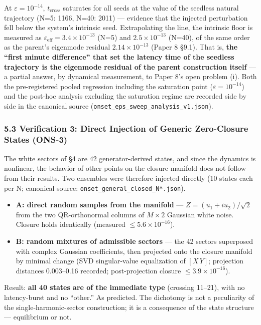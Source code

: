 \documentclass[
  a4paper,
]{article}
\providecommand{\tightlist}{%
  \setlength{\itemsep}{0pt}\setlength{\parskip}{0pt}}
\begin{document}
At \(\varepsilon=10^{-14}\), \(t_{\mathrm{cross}}\) saturates for all
seeds at the value of the seedless natural trajectory (N=5: 1166, N=40:
2011) --- evidence that the injected perturbation fell below the
system's intrinsic seed. Extrapolating the line, the intrinsic floor is
measured as \(\varepsilon_{\mathrm{eff}}=3.4\times10^{-13}\) (N=5) and
\(2.5\times10^{-13}\) (N=40), of the same order as the parent's
eigenmode residual \(2.14\times10^{-13}\) (Paper 8 §9.1). That is,
\textbf{the ``first minute difference'' that set the latency time of the
seedless trajectory is the eigenmode residual of the parent construction
itself} --- a partial answer, by dynamical measurement, to Paper 8's
open problem (i). Both the pre-registered pooled regression including
the saturation point (\(\varepsilon=10^{-14}\)) and the post-hoc
analysis excluding the saturation regime are recorded side by side in
the canonical source (\texttt{onset\_eps\_sweep\_analysis\_v1.json}).

\subsubsection{5.3 Verification 3: Direct Injection of Generic
Zero-Closure States
(ONS-3)}\label{verification-3-direct-injection-of-generic-zero-closure-states-ons-3}

The white sectors of §4 are 42 generator-derived states, and since the
dynamics is nonlinear, the behavior of other points on the closure
manifold does not follow from their results. Two ensembles were
therefore injected directly (10 states each per N; canonical source:
\texttt{onset\_general\_closed\_N*.json}).

\begin{itemize}
\tightlist
\item
  \textbf{A: direct random samples from the manifold} ---
  \(Z=(u_1+iu_2)/\sqrt2\) from the two QR-orthonormal columns of
  \(M\times2\) Gaussian white noise. Closure holds identically (measured
  \(\le5.6\times10^{-16}\)).
\item
  \textbf{B: random mixtures of admissible sectors} --- the 42 sectors
  superposed with complex Gaussian coefficients, then projected onto the
  closure manifold by minimal change (SVD singular-value equalization of
  \([X\,Y]\); projection distances 0.003--0.16 recorded; post-projection
  closure \(\le3.9\times10^{-16}\)).
\end{itemize}

Result: \textbf{all 40 states are of the immediate type} (crossing
11--21), with no latency-burst and no ``other.'' As predicted. The
dichotomy is not a peculiarity of the single-harmonic-sector
construction; it is a consequence of the state structure --- equilibrium
or not.
\end{document}
